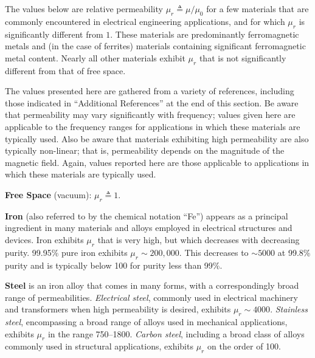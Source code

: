 

\label{m0136_Table_of_Permeabilities} %

The values below are relative permeability 
$\mu_r \triangleq \mu/\mu_0$ for a few materials that are commonly encountered in electrical engineering applications, and for which $\mu_r$ is significantly different from $1$. These materials are predominantly ferromagnetic metals and (in the case of ferrites) materials containing significant ferromagnetic metal content.
Nearly all other materials exhibit $\mu_r$ that is not significantly different from that of free space.

The values presented here are gathered from a variety of references, including those indicated in ``Additional References'' at the end of this section.
Be aware that permeability may vary significantly with frequency; values given here are applicable to the frequency ranges for applications in which these materials are typically used.
Also be aware that materials exhibiting high permeability are also typically non-linear; that is, permeability depends on the magnitude of the magnetic field.
Again, values reported here are those applicable to applications in which these materials are typically used.  

{\bf Free Space} (vacuum): $\mu_r\triangleq 1$.

{\bf Iron} 
(also referred to by the chemical notation ``Fe'') appears as a principal ingredient in many materials and alloys employed in electrical structures and devices.
Iron exhibits $\mu_r$ that is very high, but which decreases with decreasing purity.  
99.95\% pure iron exhibits $\mu_r\sim 200,000$.
This decreases to $\sim 5000$ at 99.8\% purity and is typically below 100 for purity less than 99\%. 

{\bf Steel} 
is an iron alloy that comes in many forms, with a correspondingly broad range of permeabilities. 
\emph{Electrical steel}, commonly used in electrical machinery and transformers when high permeability is desired, exhibits $\mu_r\sim 4000$. %
\emph{Stainless steel}, encompassing a broad range of alloys used in mechanical applications, exhibits $\mu_r$ in the range 750--1800. %
\emph{Carbon steel}, including a broad class of alloys commonly used in structural applications,  exhibits $\mu_r$ on the order of 100. %

